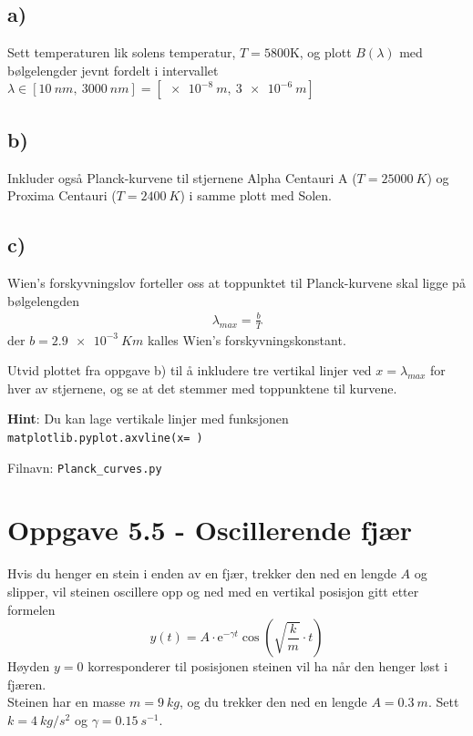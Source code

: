\documentclass[10pt,a4paper]{article}
\renewcommand{\exp}{\mathrm{e}^}
\begin{document}
\subsection*{a)}
Sett temperaturen lik solens temperatur, $T = 5800\mathrm{K}$, og plott $B(\lambda)$ med bølgelengder jevnt fordelt i intervallet $\lambda \in [\SI{10}{nm},\ \SI{3000}{nm}] = [\SI{e-8}{m},\ \SI{3e-6}{m}]$


\subsection*{b)}
Inkluder også Planck-kurvene til stjernene Alpha Centauri A ($T=\SI{25000}{K}$) og Proxima Centauri ($T=\SI{2400}{K}$) i samme plott med Solen.

\subsection*{c)}
Wien's forskyvningslov forteller oss at toppunktet til Planck-kurvene skal ligge på bølgelengden
\begin{align*}
\lambda_{max} = \frac{b}{T}
\end{align*}
der $b = \SI{2.9e-3}{Km}$ kalles Wien's forskyvningskonstant.

Utvid plottet fra oppgave b) til å inkludere tre vertikal linjer ved $x = \lambda_{max}$ for hver av stjernene, og se at det stemmer med toppunktene til kurvene.

\textbf{Hint}: Du kan lage vertikale linjer med funksjonen \texttt{matplotlib.pyplot.axvline(x= )}

Filnavn: \texttt{Planck\_curves.py}



\section*{Oppgave 5.5 - Oscillerende fjær}
Hvis du henger en stein i enden av en fjær, trekker den ned en lengde $A$ og slipper, vil steinen oscillere opp og ned med en vertikal posisjon gitt etter formelen
\[	y(t) = A\cdot \exp{-\gamma t}\cos\left(\sqrt{\frac{k}{m}}\cdot t\right)
\]
Høyden $y=0$ korresponderer til posisjonen steinen vil ha når den henger løst i fjæren.\\
Steinen har en masse $m = \SI{9}{kg}$, og du trekker den ned en lengde $A = \SI{0.3}{m}$. Sett $k = \SI{4}{kg/s^2}$ og $\gamma = \SI{0.15}{s^{-1}}$.
\end{document}
